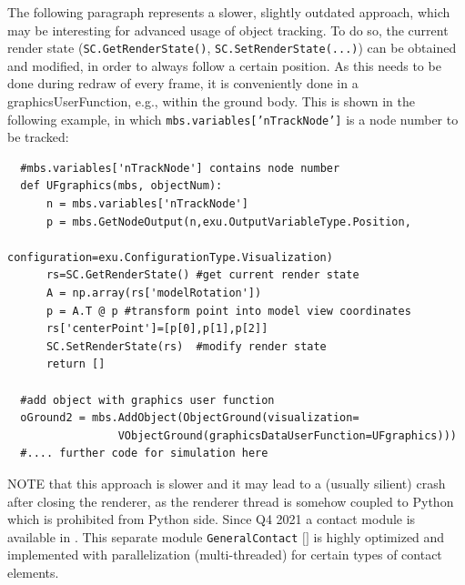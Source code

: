The following paragraph represents a slower, slightly outdated approach, which may be interesting for advanced usage of object tracking.
To do so, the current render state (\texttt{SC.GetRenderState()}, \texttt{SC.SetRenderState(...)}) can be obtained and modified, in order to always follow a certain position.
As this needs to be done during redraw of every frame, it is conveniently done in a graphicsUserFunction, e.g., within the ground body. This is shown in the following example, in which \texttt{mbs.variables['nTrackNode']} is a node number to be tracked:
%
\pythonstyle\begin{lstlisting}
  #mbs.variables['nTrackNode'] contains node number
  def UFgraphics(mbs, objectNum):
      n = mbs.variables['nTrackNode']
      p = mbs.GetNodeOutput(n,exu.OutputVariableType.Position, 
                            configuration=exu.ConfigurationType.Visualization)
      rs=SC.GetRenderState() #get current render state
      A = np.array(rs['modelRotation'])
      p = A.T @ p #transform point into model view coordinates
      rs['centerPoint']=[p[0],p[1],p[2]]
      SC.SetRenderState(rs)  #modify render state
      return []

  #add object with graphics user function
  oGround2 = mbs.AddObject(ObjectGround(visualization=
                 VObjectGround(graphicsDataUserFunction=UFgraphics)))
  #.... further code for simulation here
\end{lstlisting}
NOTE that this approach is slower and it may lead to a (usually silient) crash after closing the renderer, as the renderer thread is somehow coupled to Python which is prohibited from Python side.
%
%
Since Q4 2021 a contact module is available in \codeName. 
This separate module \texttt{GeneralContact} $[$$]$ is highly optimized and implemented with parallelization (multi-threaded) for certain types of contact elements.
%
%
%

